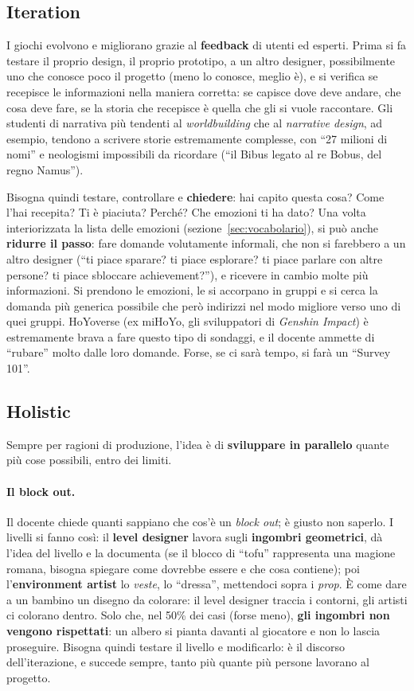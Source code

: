 \subsection{Iteration}

I giochi evolvono e migliorano grazie al \textbf{feedback} di utenti ed
esperti. Prima si fa testare il proprio design, il proprio prototipo, a un
altro designer, possibilmente uno che conosce poco il progetto (meno lo
conosce, meglio è), e si verifica se recepisce le informazioni nella maniera
corretta: se capisce dove deve andare, che cosa deve fare, se la storia che
recepisce è quella che gli si vuole raccontare. Gli studenti di narrativa più
tendenti al \emph{worldbuilding} che al \emph{narrative design}, ad esempio,
tendono a scrivere storie estremamente complesse, con ``27 milioni di nomi''
e neologismi impossibili da ricordare (``il Bibus legato al re Bobus, del
regno Namus'').

Bisogna quindi testare, controllare e \textbf{chiedere}: hai capito questa
cosa? Come l'hai recepita? Ti è piaciuta? Perché? Che emozioni ti ha dato?
Una volta interiorizzata la lista delle emozioni
(sezione~\ref{sec:vocabolario}), si può anche \textbf{ridurre il passo}:
fare domande volutamente informali, che non si farebbero a un altro designer
(``ti piace sparare? ti piace esplorare? ti piace parlare con altre persone?
ti piace sbloccare achievement?''), e ricevere in cambio molte più
informazioni. Si prendono le emozioni, le si accorpano in gruppi e si cerca
la domanda più generica possibile che però indirizzi nel modo migliore verso
uno di quei gruppi. HoYoverse (ex miHoYo, gli sviluppatori di \emph{Genshin
Impact}) è estremamente brava a fare questo tipo di sondaggi, e il docente
ammette di ``rubare'' molto dalle loro domande. Forse, se ci sarà tempo, si
farà un ``Survey 101''.

\subsection{Holistic}

Sempre per ragioni di produzione, l'idea è di \textbf{sviluppare in parallelo}
quante più cose possibili, entro dei limiti.

\paragraph{Il block out.} Il docente chiede quanti sappiano che cos'è un
\emph{block out}; è giusto non saperlo. I livelli si fanno così: il
\textbf{level designer} lavora sugli \textbf{ingombri geometrici}, dà l'idea
del livello e la documenta (se il blocco di ``tofu'' rappresenta una magione
romana, bisogna spiegare come dovrebbe essere e che cosa contiene); poi
l'\textbf{environment artist} lo \emph{veste}, lo ``dressa'', mettendoci sopra
i \emph{prop}. È come dare a un bambino un disegno da colorare: il level
designer traccia i contorni, gli artisti ci colorano dentro. Solo che, nel
50\% dei casi (forse meno), \textbf{gli ingombri non vengono rispettati}: un
albero si pianta davanti al giocatore e non lo lascia proseguire. Bisogna
quindi testare il livello e modificarlo: è il discorso dell'iterazione, e
succede sempre, tanto più quante più persone lavorano al progetto.

